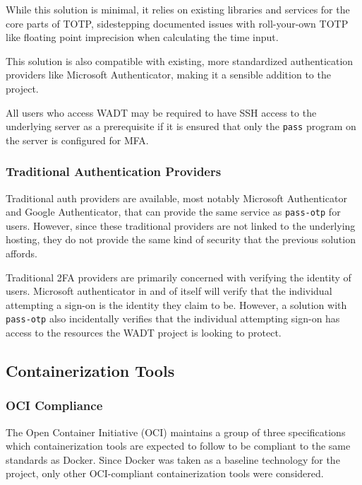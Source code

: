 \documentclass[12pt]{article}
\begin{document}
While this solution is minimal, it relies on existing libraries and services for the core parts of TOTP, sidestepping documented issues with roll-your-own TOTP like floating point imprecision when calculating the time input.

This solution is also compatible with existing, more standardized authentication providers like Microsoft Authenticator, making it a sensible addition to the project.

All users who access WADT may be required to have SSH access to the underlying server as a prerequisite if it is ensured that only the \texttt{pass} program on the server is configured for MFA.


\subsubsection{Traditional Authentication Providers}
Traditional auth providers are available, most notably Microsoft Authenticator and Google Authenticator, that can provide the same service as \texttt{pass-otp} for users. However, since these traditional providers are not linked to the underlying hosting, they do not provide the same kind of security that the previous solution affords.

Traditional 2FA providers are primarily concerned with verifying the identity of users. Microsoft authenticator in and of itself will verify that the individual attempting a sign-on is the identity they claim to be. However, a solution with \texttt{pass-otp} also incidentally verifies that the individual attempting sign-on has access to the resources the WADT project is looking to protect.


\subsection{Containerization Tools}
\subsubsection{OCI Compliance}
The Open Container Initiative (OCI) maintains a group of three specifications which containerization tools are expected to follow to be compliant to the same standards as Docker. Since Docker was taken as a baseline technology for the project, only other OCI-compliant containerization tools were considered.
\end{document}
